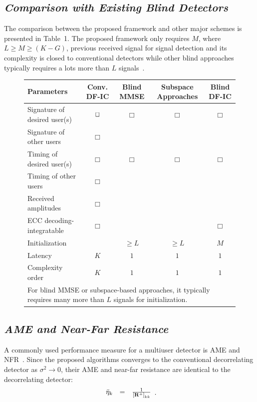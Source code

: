 \documentclass[a4paper,10pt,fleqn, twocolumn]{IEEETran}
\newcommand{\bR}{{\bf R}}
\begin{document}
\subsection{\em Comparison with Existing Blind Detectors}
The comparison between the proposed framework and other major
schemes is presented in Table~1. The proposed framework only
requires $M$, where $L\ge M\ge (K-G)$, previous received signal
for signal detection and its complexity is closed to conventional
detectors while other blind approaches typically requires a lots
more than $L$ signals~\cite{Madh94,Wang98,Zhang02}.
\begin{figure}[t]\label{SchemComp}
\begin{center}
\begin{tabular}{lcccc}
Parameters & Conv. DF-IC & Blind MMSE & Subspace Approaches & Blind DF-IC\\
\hline
\hline
Signature of desired user(s) & $\bf\Box$ & $\mathbf\Box$ &  $\mathbf\Box$ & $\mathbf\Box$ \\
Signature of other users & $\mathbf\Box$ & &  \\
Timing of desired user(s)  & $\mathbf\Box$ & $\mathbf\Box$ & $\mathbf\Box$ & $\mathbf\Box$ \\
Timing of other users  & $\mathbf\Box$ & & & \\
Received amplitudes  & $\mathbf\Box$ & &  &\\
ECC decoding-integratable& $\mathbf\Box$ &&& $\mathbf\Box$ \\
Initialization~{\small *} &  & $\ge L$ & $\ge L$ & $M$\\
Latency & $K$ & $1$ & $1$ & $1$ \\
Complexity order & $K$ & $1$ & $1$ & $1$ \\
\hline \hline \multicolumn{5}{l}{\small * For blind MMSE or
subspace-based approaches, it typically requires many more than
$L$ signals for initialization.}
\end{tabular}
\end{center}
\end{figure}
\subsection{\em AME and Near-Far Resistance}
A commonly used performance measure for a multiuser detector is
AME and NFR~\cite{Verd98}. Since the proposed algorithms converges
to the conventional decorrelating detector as $\sigma^2\rightarrow
0$, their AME and near-far resistance are identical to the
decorrelating detector:
\begin{equation}
\begin{array}{rcl}
\bar{\eta}_k&=&\frac{1}{\left[\bR^{+}\right]_{kk}}
\end{array}.
\end{equation}
\end{document}
